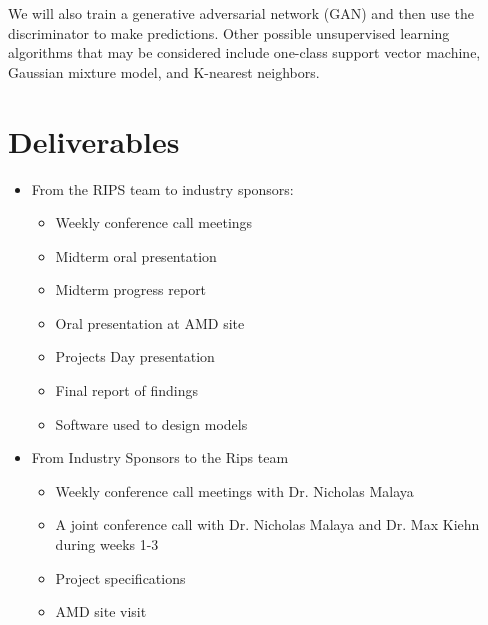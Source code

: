 \documentclass[12pt]{article}
\begin{document}
\noindent We will also train a generative adversarial network (GAN)\cite{2014arXiv1406.2661G} 
and then use the discriminator to make predictions. Other possible unsupervised learning algorithms that may be considered include one-class support vector machine, Gaussian mixture model, and K-nearest neighbors.


\section{Deliverables}
\begin{itemize}
    \item From the RIPS team to industry sponsors:
    \begin{itemize}
        \item Weekly conference call meetings
        \item Midterm oral presentation
        \item Midterm progress report
        \item Oral presentation at AMD site
        \item Projects Day presentation
        \item Final report of findings
        \item Software used to design models
    \end{itemize}
    \item From Industry Sponsors to the Rips team
    \begin{itemize}
        \item Weekly conference call meetings with Dr. Nicholas Malaya
        
        \item A joint conference call with Dr. Nicholas Malaya and Dr. Max Kiehn during weeks 1-3
        
        \item Project specifications
        
        \item AMD site visit
    \end{itemize}
\end{itemize}
\end{document}
